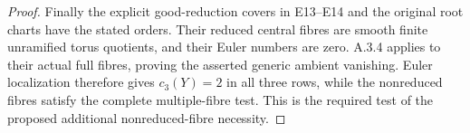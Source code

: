 \begin{proof}
Finally the explicit good-reduction covers in E13--E14
and the original root charts have the stated orders.
Their reduced central fibres are smooth finite unramified
torus quotients, and their Euler numbers are zero.
A.3.4 applies to their actual full fibres, proving the
asserted generic ambient vanishing. Euler localization
therefore gives $c_3(Y)=2$ in all three rows, while the
nonreduced fibres satisfy the complete multiple-fibre
test. This is the required test of the proposed additional
nonreduced-fibre necessity.
\end{proof}

